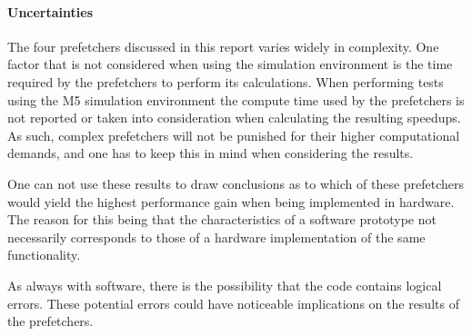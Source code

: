 \paragraph{Uncertainties}
\label{"waiting for reftex-label call..."}
The four prefetchers discussed in this report varies widely in
complexity. One factor that is not considered when using the
simulation environment is the time required by the prefetchers to
perform its calculations. When performing tests using the M5
simulation environment the compute time used by the prefetchers is not
reported or taken into consideration when calculating the resulting
speedups. As such, complex prefetchers will not be punished for their
higher computational demands, and one has to keep this in mind when
considering the results.

One can not use these results to draw conclusions as to which of these prefetchers would yield the highest performance gain when being implemented in hardware. The reason for this being that the characteristics of a software prototype not necessarily corresponds to those of a hardware implementation of the same functionality.

As always with software, there is the possibility that the code
contains logical errors. These potential errors could have noticeable
implications on the results of the prefetchers.
